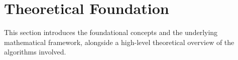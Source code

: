 \section{Theoretical Foundation}

This section introduces the foundational concepts and the underlying mathematical framework, alongside a high-level theoretical overview of the algorithms involved.









